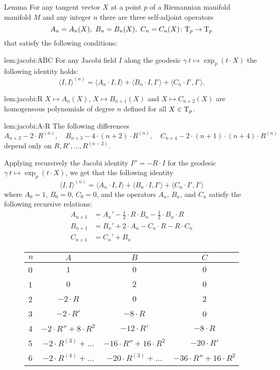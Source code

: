 \documentclass[a4paper,10pt]{article}
\begin{document}
\begin{thm}{Lemma}\label{lem:jacobi}
For any tangent vector $X$ at a point $p$ of a Riemannian manifold manifold $M$ and any integer $n$ there are three self-adjoint operators 
\[A_n=A_n(X),\ B_n=B_n(X),\ C_n=C_n(X)\colon\mathrm{T}_p\to \mathrm{T}_p\]
that satisfy the following conditions:

\begin{subthm}{lem:jacobi:ABC}
For any Jacobi field $I$ along the geodesic $\gamma\:t\mapsto \exp_p(t\cdot X)$ the following identity holds:
\[\langle I,I\rangle^{(n)}
=
\langle A_n\cdot  I,I\rangle+ \langle B_n\cdot I, I'\rangle+\langle C_n\cdot I', I'\rangle.\]
\end{subthm}

\begin{subthm}{lem:jacobi:R}
 $X\mapsto A_{n}(X)$, $X\mapsto B_{n+1}(X)$ and $X\mapsto C_{n+2}(X)$ are homogeneous polynomials of degree $n$ defined for all $X\in \mathrm{T}_p$.
\end{subthm}

\begin{subthm}{lem:jacobi:A-R}
The following differences  
\[A_{n+2}-2\cdot R^{(n)},
\quad 
B_{n+3}-4\cdot(n+2)\cdot R^{(n)},
\quad
C_{n+4}-2\cdot(n+1)\cdot(n+4)\cdot R^{(n)}\]
depend only on $R,R',\dots, R^{(n-2)}$.
\end{subthm}


\end{thm}

Applying recursively the Jacobi identity $I''=-R\cdot I$ for the geodesic $\gamma\:t\mapsto\exp_p(t\cdot X)$, we get that the following identity 
\[\langle I,I\rangle^{(n)}
=
\langle A_n\cdot  I,I\rangle+ \langle B_n\cdot I,I'\rangle+\langle C_n\cdot I',I'\rangle\]
where $A_0=1$, $B_0=0$, $C_0=0$, and the operators $A_n$, $B_n$, and $C_n$ satisfy the following recursive relations:
\begin{align*}
A_{n+1}&=A_n'-\tfrac12\cdot R\cdot B_n-\tfrac12\cdot B_n\cdot R
\\
B_{n+1}&=B_n'+ 2\cdot A_n-C_n\cdot R-R\cdot C_n
\\
C_{n+1}&=C_n'+ B_n
\end{align*}

\renewcommand{\arraystretch}{1.5}
\begin{figure}[!ht]
\centering
\begin{tabular}{ l|c|c|c }
$n$ & $A$ & $B$ & $C$ \\ \hline
0& $1$   &  $0$  & $0$ \\ \hline
1& $0$   &  $2$  & $0$ \\ \hline 
2& $-2\cdot R$ & $0$ & $2$ \\ \hline 
3& $-2\cdot R'$ & $-8\cdot R$ & 0  \\ \hline 
4& $-2\cdot R''+8\cdot R^2$ & $-12\cdot R'$ & $-8\cdot R$  \\ \hline
5& $-2\cdot R^{(3)}+\dots$ 
& $-16\cdot R''+16\cdot R^2$ & $-20\cdot R'$  \\ \hline
6
&$-2\cdot R^{(4)}+\dots$
&$-20\cdot R^{(3)}+\dots$
&$-36\cdot R''+16\cdot R^2$
\\
\end{tabular}
\end{figure} 
\end{document}
